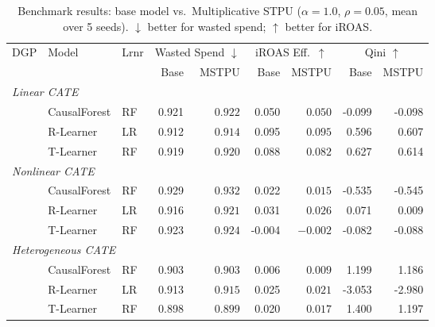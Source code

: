 \begin{table}[t]
\centering
\caption{Benchmark results: base model vs.\ Multiplicative STPU ($\alpha=1.0$, $\rho=0.05$, mean over 5 seeds). $\downarrow$ better for wasted spend; $\uparrow$ better for iROAS.}
\label{tab:main_results}
\small
\begin{tabular}{lll rr rr rr}
\toprule
DGP & Model & Lrnr & \multicolumn{2}{c}{Wasted Spend $\downarrow$} & \multicolumn{2}{c}{iROAS Eff.\ $\uparrow$} & \multicolumn{2}{c}{Qini $\uparrow$} \\
\cmidrule(lr){4-5}\cmidrule(lr){6-7}\cmidrule(lr){8-9}
& & & Base & MSTPU & Base & MSTPU & Base & MSTPU \\
\midrule
\multicolumn{9}{l}{\textit{Linear CATE}} \\
  & CausalForest & RF & 0.921 & $0.922$ & 0.050 & $0.050$ & -0.099 & -0.098 \\
  & R-Learner & LR & 0.912 & $0.914$ & 0.095 & $\mathbf{0.095}$ & 0.596 & 0.607 \\
  & T-Learner & RF & 0.919 & $0.920$ & 0.088 & $0.082$ & 0.627 & 0.614 \\
\midrule
\multicolumn{9}{l}{\textit{Nonlinear CATE}} \\
  & CausalForest & RF & 0.929 & $0.932$ & 0.022 & $0.015$ & -0.535 & -0.545 \\
  & R-Learner & LR & 0.916 & $0.921$ & 0.031 & $0.026$ & 0.071 & 0.009 \\
  & T-Learner & RF & 0.923 & $0.924$ & -0.004 & $\mathbf{-0.002}$ & -0.082 & -0.088 \\
\midrule
\multicolumn{9}{l}{\textit{Heterogeneous CATE}} \\
  & CausalForest & RF & 0.903 & $0.903$ & 0.006 & $\mathbf{0.009}$ & 1.199 & 1.186 \\
  & R-Learner & LR & 0.913 & $0.915$ & 0.025 & $0.021$ & -3.053 & -2.980 \\
  & T-Learner & RF & 0.898 & $0.899$ & 0.020 & $0.017$ & 1.400 & 1.197 \\
\midrule
\bottomrule
\end{tabular}
\end{table}